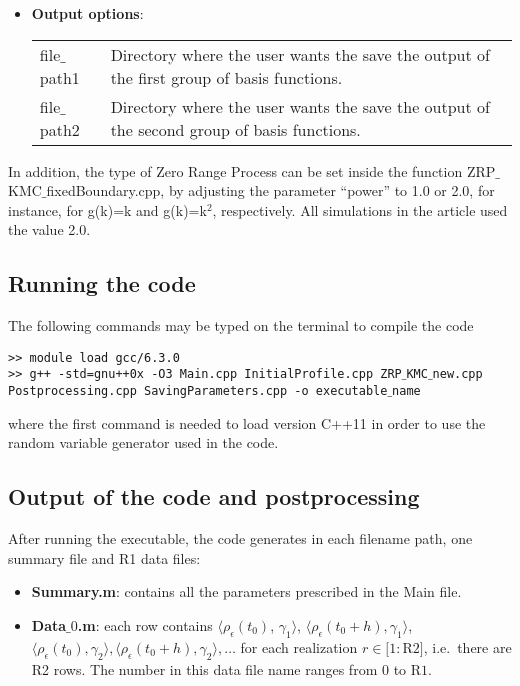 \documentclass[authoryear,3p,11pt]{elsarticle}
\begin{document}
\begin{itemize}
\item {\bf Output options}:\\
\begin{tabular}{p{2.2cm} p{12.5cm}  }
 file$\_$path1 &  Directory where the user wants the save the output of the first group of basis functions. \\
 file$\_$path2 &  Directory where the user wants the save the output of the second group of basis functions.
\end{tabular}
\end{itemize}

In addition, the type of Zero Range Process can be set inside the function ZRP$\_$KMC$\_$fixedBoundary.cpp, by adjusting the parameter ``power'' to 1.0 or 2.0, for instance, for g(k)=k and g(k)=k$^2$, respectively. All simulations in the article used the value 2.0.


\subsection{Running the code} 


The following commands may be typed on the terminal to compile the code

{\tt >> module load gcc/6.3.0 } \\
{\tt >> g++ -std=gnu++0x -O3 Main.cpp InitialProfile.cpp ZRP$\_$KMC$\_$new.cpp Postprocessing.cpp SavingParameters.cpp -o executable$\_$name}

where the first command is needed to load version C++11 in order to use the random variable generator used in the code.


\subsection{Output of the code and postprocessing} \label{Sec:OutputZRP}


After running the executable, the code generates in each filename path, one summary file and R1 data files:

\begin{itemize}
\item {\bf Summary.m}: contains all the parameters prescribed in the Main file.
\item {\bf Data$\_0$.m}: each row contains $\langle \rho_{\epsilon}(t_0)$, $\gamma_1 \rangle$, $\langle \rho_{\epsilon}(t_0+h),\gamma_1 \rangle$, $\langle \rho_{\epsilon}(t_0),\gamma_2 \rangle, \langle \rho_{\epsilon}(t_0+h),\gamma_2 \rangle, \ldots$ for each realization $r\in[1:$R$2]$, i.e.~there are R2 rows. The number in this data file name ranges from $0$ to R$1$.
\end{itemize}
\end{document}
